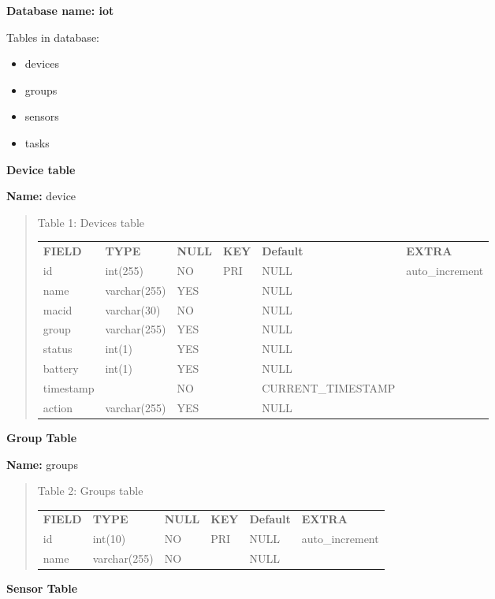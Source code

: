 \documentclass[16pt]{article}
\begin{document}
\textbf{Database name: iot}

Tables in database: 

\begin{itemize}

\item devices
\item groups 
\item sensors
\item tasks  

\end{itemize}

\textbf{Device table}

\textbf{Name:} device

\begin{quote}

	\centering
	 \caption{Table 1: Devices table}
	\label{my-label}
	\begin{tabular}{llllll}
		{\bf FIELD} & {\bf TYPE}   & {\bf NULL} & {\bf KEY} & {\bf Default}      & {\bf EXTRA}     \\
		id          & int(255)     & NO         & PRI       & NULL               & auto\_increment \\
		name        & varchar(255) & YES        &           & NULL               &                 \\
		macid       & varchar(30)  & NO         &           & NULL               &                 \\
		group       & varchar(255) & YES        &           & NULL               &                 \\
		status      & int(1)       & YES        &           & NULL               &                 \\
		battery     & int(1)       & YES        &           & NULL               &                 \\
		timestamp   &              & NO         &           & CURRENT\_TIMESTAMP &                 \\
		action      & varchar(255) & YES        &           & NULL               &                
	\end{tabular}
	
\end{quote}
\textbf{Group Table}

\textbf{Name:} groups

\begin{quote}
	\centering
	\caption{Table 2: Groups table}
	\label{my-label}
	\begin{tabular}{llllll}
		{\bf FIELD} & {\bf TYPE}   & {\bf NULL} & {\bf KEY} & {\bf Default} & {\bf EXTRA}     \\
		id          & int(10)      & NO         & PRI       & NULL          & auto\_increment \\
		name        & varchar(255) & NO         &           & NULL          &                
	\end{tabular}

\end{quote}
\textbf{Sensor Table}
\end{document}
